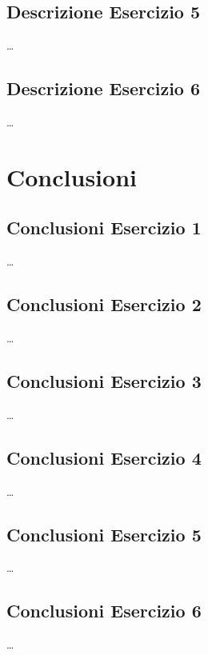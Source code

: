 \documentclass[a4paper]{article}
\begin{document}
\subsection{Descrizione Esercizio 5}
\dots

\subsection{Descrizione Esercizio 6}
\dots

\section{Conclusioni}
\subsection{Conclusioni Esercizio 1}
\dots
\subsection{Conclusioni Esercizio 2}
\dots
\subsection{Conclusioni Esercizio 3}
\dots
\subsection{Conclusioni Esercizio 4}
\dots
\subsection{Conclusioni Esercizio 5}
\dots
\subsection{Conclusioni Esercizio 6}
\dots
\end{document}

